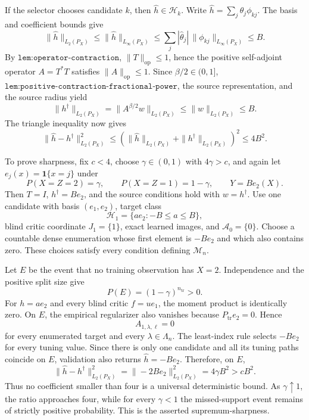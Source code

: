 If the selector chooses candidate \(k\), then \(\widehat h\in\mathcal H_k\). Write \(\widehat h=\sum_j\widehat\theta_j\phi_{kj}\). The basis and coefficient bounds give
\[
 \|\widehat h\|_{L_2(P_X)}
 \le\|\widehat h\|_{L_\infty(P_X)}
 \le\sum_j|\widehat\theta_j|\,\|\phi_{kj}\|_{L_\infty(P_X)}
 \le B.
\]
By \(\texttt{lem:operator-contraction}\), \(\|T\|_{\mathrm{op}}\le1\), hence the positive self-adjoint operator \(A=T^*T\) satisfies \(\|A\|_{\mathrm{op}}\le1\). Since \(\beta/2\in(0,1]\), \(\texttt{lem:positive-contraction-fractional-power}\), the source representation, and the source radius yield
\[
 \|h^\dagger\|_{L_2(P_X)}
 =\|A^{\beta/2}w\|_{L_2(P_X)}
 \le\|w\|_{L_2(P_X)}
 \le B.
\]
The triangle inequality now gives
\[
 \|\widehat h-h^\dagger\|_{L_2(P_X)}^2
 \le(\|\widehat h\|_{L_2(P_X)}+\|h^\dagger\|_{L_2(P_X)})^2
 \le4B^2.
\]

To prove sharpness, fix \(c<4\), choose \(\gamma\in(0,1)\) with \(4\gamma>c\), and again let \(e_j(x)=\mathbf 1\{x=j\}\) under
\[
 P(X=Z=2)=\gamma,
 \qquad
 P(X=Z=1)=1-\gamma,
 \qquad
 Y=B e_2(X).
\]
Then \(T=I\), \(h^\dagger=B e_2\), and the source conditions hold with \(w=h^\dagger\). Use one candidate with basis \((e_1,e_2)\), target class
\[
 \mathcal H_1=\{a e_2:-B\le a\le B\},
\]
blind critic coordinate \(J_1=\{1\}\), exact learned images, and \(\mathcal A_0=\{0\}\). Choose a countable dense enumeration whose first element is \(-B e_2\) and which also contains zero. These choices satisfy every condition defining \(\mathcal M_n\).

Let \(E\) be the event that no training observation has \(X=2\). Independence and the positive split size give
\[
 P(E)=(1-\gamma)^{n_{\mathrm{tr}}}>0.
\]
For \(h=a e_2\) and every blind critic \(f=u e_1\), the moment product is identically zero. On \(E\), the empirical regularizer also vanishes because \(P_{\mathrm{tr}}e_2=0\). Hence
\[
 A_{1,\lambda,\ell}=0
\]
for every enumerated target and every \(\lambda\in\Lambda_n\). The least-index rule selects \(-B e_2\) for every tuning value. Since there is only one candidate and all its tuning paths coincide on \(E\), validation also returns \(\widehat h=-B e_2\). Therefore, on \(E\),
\[
 \|\widehat h-h^\dagger\|_{L_2(P_X)}^2
 =\|-2B e_2\|_{L_2(P_X)}^2
 =4\gamma B^2
 >cB^2.
\]
Thus no coefficient smaller than four is a universal deterministic bound. As \(\gamma\uparrow1\), the ratio approaches four, while for every \(\gamma<1\) the missed-support event remains of strictly positive probability. This is the asserted supremum-sharpness.